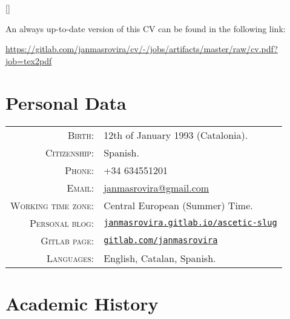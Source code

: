 \documentclass[11pt]{article}
\begin{document}
\par{\bigskip\par}
\titleformat{\section}{\Large\scshape\raggedright}{}{0em}{}[\titlerule]

An always up-to-date version of this CV can be found in the following link:
\begin{center}
\url{https://gitlab.com/janmasrovira/cv/-/jobs/artifacts/master/raw/cv.pdf?job=tex2pdf}
\end{center}

\section{Personal Data}

\begin{tabular}{rl}
\textsc{Birth:} & 12th of January 1993 (Catalonia).\\
\textsc{Citizenship:} & Spanish.\\
\textsc{Phone:} & +34 634551201\\
\textsc{Email:} & \href{mailto:janmasrovira@gmail.com}{janmasrovira@gmail.com} \\
\textsc{Working time zone:} & Central European (Summer) Time.  \\
\textsc{Personal blog:} & \href{https://janmasrovira.gitlab.io/ascetic-slug/}{\texttt{janmasrovira.gitlab.io/ascetic-slug}} \\
\textsc{Gitlab page:} & \href{https://gitlab.com/janmasrovira}{\texttt{gitlab.com/janmasrovira}} \\
\textsc{Languages:} & English, Catalan, Spanish.
\end{tabular}

\section{Academic History}
\end{document}

